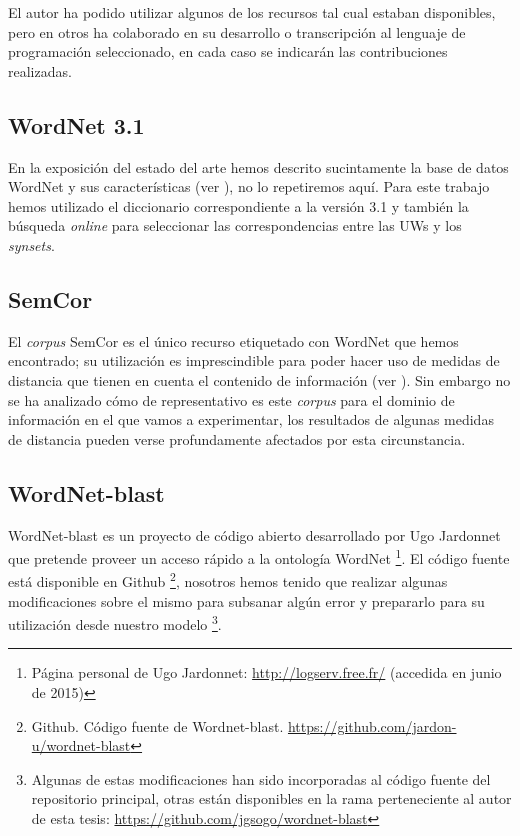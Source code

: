 \documentclass[a4paper,12pt,spanish]{book}
\begin{document}
El autor ha podido utilizar algunos de los recursos tal cual estaban disponibles,
pero en otros ha colaborado en su desarrollo o transcripción al lenguaje de
programación seleccionado, en cada caso se indicarán las contribuciones realizadas.


\subsection{WordNet 3.1}
\label{4.model/i.recursos:wordnet-3-1}
En la exposición del estado del arte hemos descrito sucintamente la base de datos WordNet y
sus características (ver {\hyperref[1.state-of-the-art/i.representacion-conocimiento:wordnet]{\emph{}}}), no lo repetiremos aquí. Para este
trabajo hemos utilizado el diccionario correspondiente a la versión 3.1 y también la
búsqueda \emph{online} para seleccionar las correspondencias entre las UWs y los \emph{synsets}.


\subsection{SemCor}
\label{4.model/i.recursos:semcor}
El \emph{corpus} SemCor es el único recurso etiquetado con WordNet que hemos encontrado; su
utilización es imprescindible para poder hacer uso de medidas de distancia que tienen
en cuenta el contenido de información
(ver {\hyperref[1.state-of-the-art/ii.medidas-distancia:redes-conceptos-contenido-informacion]{\emph{}}}). Sin embargo no
se ha analizado cómo de representativo es este \emph{corpus} para el dominio de información
en el que vamos a experimentar, los resultados de algunas medidas de distancia pueden
verse profundamente afectados por esta circunstancia.


\subsection{WordNet-blast}
\label{4.model/i.recursos:wordnet-blast}
WordNet-blast es un proyecto de código abierto desarrollado por Ugo Jardonnet que pretende
proveer un acceso rápido a la ontología WordNet \footnote{
Página personal de Ugo Jardonnet: \href{http://logserv.free.fr/}{http://logserv.free.fr/} (accedida en junio de 2015)
}. El código fuente está disponible en
Github \footnote{
Github. Código fuente de Wordnet-blast. \href{https://github.com/jardon-u/wordnet-blast}{https://github.com/jardon-u/wordnet-blast}
}, nosotros hemos tenido que realizar algunas modificaciones sobre el mismo para
subsanar algún error y prepararlo para su utilización desde nuestro modelo \footnote{
Algunas de estas modificaciones han sido incorporadas al código fuente del repositorio
principal, otras están disponibles en la rama perteneciente al autor de esta
tesis: \href{https://github.com/jgsogo/wordnet-blast}{https://github.com/jgsogo/wordnet-blast}
}.
\end{document}
